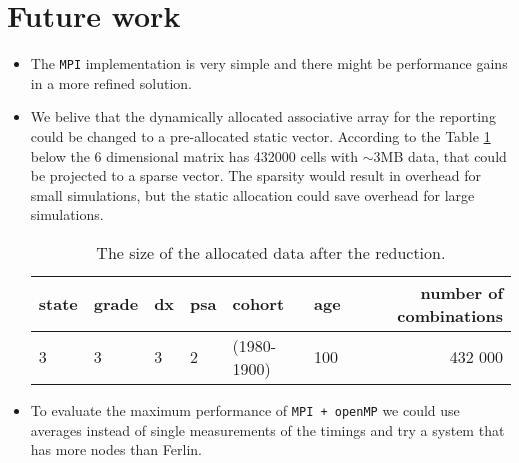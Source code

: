 \section{Future work}
\begin{itemize}
\item The \texttt{MPI} implementation is very simple and there might be
performance gains in a more refined solution.
\item We belive that the dynamically allocated associative array for
  the reporting could be changed to a pre-allocated static vector. According to the
  Table \ref{tab:comb} below the 6 dimensional matrix has 432000 cells
  with $\sim$3MB data, that could be projected to a sparse
  vector. The sparsity would result in overhead for small simulations,
  but the static allocation could save overhead for large simulations.

\begin{table}[!htbp]
  \begin{center}
    \begin{tabular}{ | l | l | l | l | l | l | r | }
      \hline
      state & grade & dx & psa & cohort      & age & number of combinations \\
      \hline
      3     & 3     & 3  & 2   & (1980-1900) & 100 & 432 000                \\
      \hline
    \end{tabular}
\end{center}
\caption{The size of the allocated data after the reduction.}
\label{tab:comb}
\end{table}

\item To evaluate the maximum performance of \texttt{MPI + openMP} we could use
  averages instead of single measurements of the timings and try a
  system that has more nodes than Ferlin.
\end{itemize}
